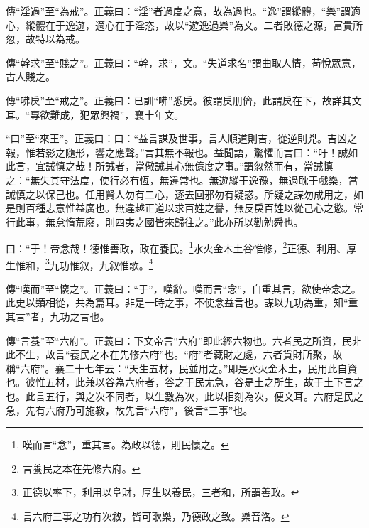 {\noindent\zhuan{}\fzbyks 傳“淫過”至“為戒”。正義曰：“淫”者過度之意，故為過也。“逸”謂縱體，“樂”謂適心，縱體在于逸遊，適心在于淫恣，故以“遊逸過樂”為文。二者敗德之源，富貴所忽，故特以為戒。 \par}

{\noindent\zhuan{}\fzbyks 傳“幹求”至“賤之”。正義曰：“幹，求”，文。“失道求名”謂曲取人情，苟悅眾意，古人賤之。 \par}

{\noindent\zhuan{}\fzbyks 傳“咈戾”至“戒之”。正義曰：已訓“咈”悉戾。彼謂戾朋儕，此謂戾在下，故詳其文耳。“專欲難成，犯眾興禍”，襄十年文。 \par}

{\noindent\shu{}\fzkt “曰”至“來王”。正義曰：曰：“益言謀及世事，言人順道則吉，從逆則兇。吉凶之報，惟若影之隨形，響之應聲。”言其無不報也。益聞語，驚懼而言曰：“吁！誠如此言，宜誡慎之哉！所誡者，當儆誡其心無億度之事。”謂忽然而有，當誡慎之：“無失其守法度，使行必有恆，無違常也。無遊縱于逸豫，無過耽于戲樂，當誡慎之以保己也。任用賢人勿有二心，逐去回邪勿有疑惑。所疑之謀勿成用之，如是則百種志意惟益廣也。無違越正道以求百姓之譽，無反戾百姓以從己心之慾。常行此事，無怠惰荒廢，則四夷之國皆來歸往之。”此亦所以勸勉舜也。 \par}

曰：“于！帝念哉！德惟善政，政在養民。\footnote{嘆而言“念”，重其言。為政以德，則民懷之。}水火金木土谷惟修，\footnote{言養民之本在先修六府。}正德、利用、厚生惟和，\footnote{正德以率下，利用以阜財，厚生以養民，三者和，所謂善政。}九功惟叙，九叙惟歌。\footnote{言六府三事之功有次敘，皆可歌樂，乃德政之致。樂音洛。}

{\noindent\zhuan{}\fzbyks 傳“嘆而”至“懷之”。正義曰：“于”，嘆辭。嘆而言“念”，自重其言，欲使帝念之。此史以類相從，共為篇耳。非是一時之事，不使念益言也。謀以九功為重，知“重其言”者，九功之言也。 \par}

{\noindent\zhuan{}\fzbyks 傳“言養”至“六府”。正義曰：下文帝言“六府”即此經六物也。六者民之所資，民非此不生，故言“養民之本在先修六府”也。“府”者藏財之處，六者貨財所聚，故稱“六府”。襄二十七年云：“天生五材，民並用之。”即是水火金木土，民用此自資也。彼惟五材，此兼以谷為六府者，谷之于民尢急，谷是土之所生，故于土下言之也。此言五行，與之次不同者，以生數為次，此以相刻為次，便文耳。六府是民之急，先有六府乃可施教，故先言“六府”，後言“三事”也。 \par}


